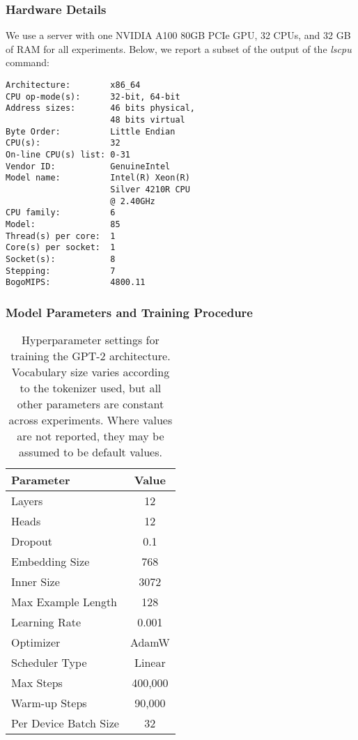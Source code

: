 \subsubsection{Hardware Details}

We use a server with one NVIDIA A100 80GB PCIe GPU, 32 CPUs, and 32 GB of RAM for all experiments. Below, we report a subset of the output of the \emph{lscpu} command:

\begin{tcolorbox}[left=5pt,right=5pt,top=5pt,bottom=5pt]
\small
\begin{verbatim}
Architecture:        x86_64
CPU op-mode(s):      32-bit, 64-bit
Address sizes:       46 bits physical, 
                     48 bits virtual
Byte Order:          Little Endian
CPU(s):              32
On-line CPU(s) list: 0-31
Vendor ID:           GenuineIntel
Model name:          Intel(R) Xeon(R)
                     Silver 4210R CPU
                     @ 2.40GHz
CPU family:          6
Model:               85
Thread(s) per core:  1
Core(s) per socket:  1
Socket(s):           8
Stepping:            7
BogoMIPS:            4800.11
\end{verbatim}
\end{tcolorbox}

\subsubsection{Model Parameters and Training Procedure}

\begin{table}[ht!]
    \centering
    \small
    \begin{tabular}{lc}
    \toprule
         Parameter & Value\\
    \midrule
         Layers & 12 \\
         Heads & 12 \\
         Dropout & 0.1 \\
         Embedding Size & 768 \\
         Inner Size & 3072 \\
         Max Example Length & 128 \\
         Learning Rate & 0.001 \\
         Optimizer & AdamW \\
         Scheduler Type & Linear\\
         Max Steps & 400,000 \\
         Warm-up Steps & 90,000\\
         Per Device Batch Size & 32 \\
    \bottomrule
    \end{tabular}
    \caption{Hyperparameter settings for training the GPT-2 architecture. Vocabulary size varies according to the tokenizer used, but all other parameters are constant across experiments. Where values are not reported, they may be assumed to be default values.}
    \label{table:baseline_hyperparams}
\end{table}

